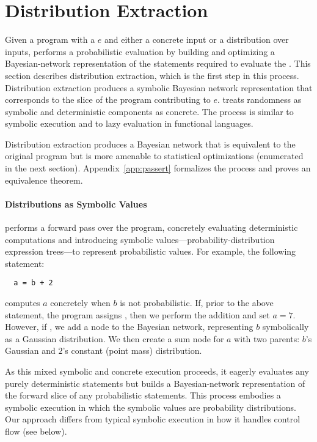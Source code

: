 \section{Distribution Extraction} 
\label{passert:sec:distex}


Given a program with a \passert $e$ and either a concrete input or a
distribution over inputs,
\tool performs a probabilistic evaluation
by building and optimizing a Bayesian-network representation of the statements
required to evaluate the \passert.  This section describes
distribution extraction, which is the first step in this process.
Distribution extraction produces a symbolic Bayesian network representation
that corresponds to the slice of the program contributing to $e$.
\tool treats randomness as symbolic and
deterministic components as concrete.
The process is similar to symbolic execution and to lazy evaluation in
functional languages.

Distribution extraction produces a Bayesian network that is equivalent to the
original program but is more amenable to statistical optimizations (enumerated
in the next section).
Appendix~\ref{app:passert} formalizes the process and proves an equivalence
theorem.

\paragraph{Distributions as Symbolic Values}
\mayhap performs a forward pass over the program, concretely
evaluating deterministic computations and introducing symbolic
values---probability-distribution expression trees---to represent
probabilistic values. For example, the following statement: 
%
\begin{lstlisting}
  a = b + 2
\end{lstlisting}
%
computes $a$ concretely when $b$ is not probabilistic.  If, prior to the above
statement, the program assigns , then we perform the
addition and set $a=7$.  However, if , we
add a node to the Bayesian network, representing $b$
symbolically as a Gaussian distribution.  We then create a sum node for
$a$ with two parents: $b$'s Gaussian  and $2$'s constant (point mass) distribution.

As this mixed symbolic and concrete execution proceeds, it eagerly
evaluates any purely deterministic statements but builds a Bayesian-network
representation
of the forward slice of any probabilistic statements.  This
process embodies a symbolic execution in which the symbolic values are
probability distributions. Our approach differs from typical symbolic
execution
in how it handles control flow (see below).  

